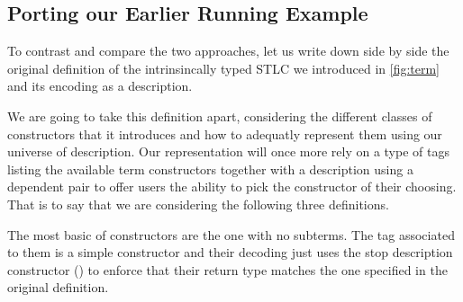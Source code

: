 \subsection{Porting our Earlier Running Example}

To contrast and compare the two approaches, let us write down side by side
the original definition of the intrinsincally typed STLC we introduced in
\cref{fig:term} and its encoding as a description.

We are going to take this definition apart, considering the different
classes of constructors that it introduces and how to adequatly represent
them using our universe of description. Our representation will once more
rely on a type  of tags listing the available term constructors
together with a description  using a dependent pair to offer users
the ability to pick the constructor of their choosing. That is to say that
we are considering the following three definitions.

\noindent\begin{minipage}[t]{0.5\textwidth}
\end{minipage}\begin{minipage}[t]{0.5\textwidth}
  \begin{AgdaSuppressSpace}
  \end{AgdaSuppressSpace}
\end{minipage}

The most basic of constructors are the one with no subterms. The tag
associated to them is a simple constructor and their decoding just
uses the stop description constructor () to enforce that
their return type matches the one specified in the original definition.

\noindent\begin{minipage}[t]{0.4\textwidth}
\end{minipage}\begin{minipage}[t]{0.6\textwidth}
  \begin{AgdaSuppressSpace}
  \end{AgdaSuppressSpace}
\end{minipage}

